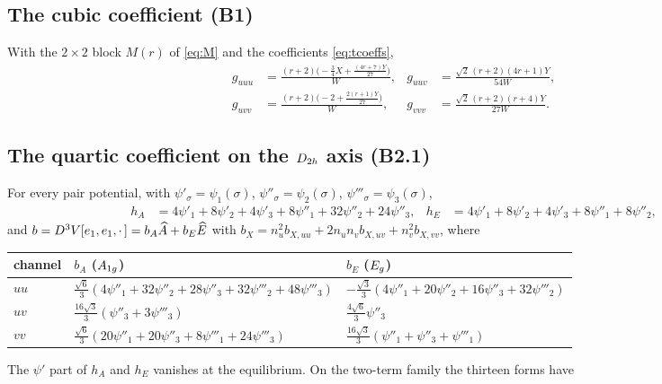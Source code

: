 \subsection{The cubic coefficient (B1)}
With the $2\times2$ block $M(r)$ of \eqref{eq:M} and the coefficients \eqref{eq:tcoeffs},
\begin{align*}
g_{uuu}&=\frac{(r+2)\bigl(-\frac34X+\frac{(4r+7)Y}{27}\bigr)}{W}, &
g_{uuv}&=\frac{\sqrt2\,(r+2)(4r+1)Y}{54W},\\
g_{uvv}&=\frac{(r+2)\bigl(-2+\frac{2(r+1)Y}{27}\bigr)}{W}, &
g_{vvv}&=\frac{\sqrt2\,(r+2)(r+4)Y}{27W}.
\end{align*}

\subsection{The quartic coefficient on the $D_{2h}$ axis (B2.1)}
For every pair potential, with $\psi'_\sigma=\psi_1(\sigma)$, $\psi''_\sigma=\psi_2(\sigma)$, $\psi'''_\sigma=\psi_3(\sigma)$,
\begin{align*}
h_A&=4\psi'_1+8\psi'_2+4\psi'_3+8\psi''_1+32\psi''_2+24\psi''_3, &
h_E&=4\psi'_1+8\psi'_2+4\psi'_3+8\psi''_1+8\psi''_2,
\end{align*}
and $b=D^3V[e_1,e_1,\cdot\,]=b_A\widehat{A}+b_E\widehat{E}$ with $b_X=n_u^2b_{X,uu}+2n_un_vb_{X,uv}+n_v^2b_{X,vv}$, where
\begin{center}\small
\begin{tabular}{lll}
\toprule
channel & $b_{A}$ ($A_{1g}$) & $b_{E}$ ($E_{g}$)\\
\midrule
$uu$ & $\frac{\sqrt6}{3}(4\psi''_1+32\psi''_2+28\psi''_3+32\psi'''_2+48\psi'''_3)$ & $-\frac{\sqrt3}{3}(4\psi''_1+20\psi''_2+16\psi''_3+32\psi'''_2)$\\
$uv$ & $\frac{16\sqrt3}{3}(\psi''_3+3\psi'''_3)$ & $\frac{4\sqrt6}{3}\psi''_3$\\
$vv$ & $\frac{\sqrt6}{3}(20\psi''_1+20\psi''_3+8\psi'''_1+24\psi'''_3)$ & $\frac{16\sqrt3}{3}(\psi''_1+\psi''_3+\psi'''_1)$\\
\bottomrule
\end{tabular}
\end{center}
The $\psi'$ part of $h_A$ and $h_E$ vanishes at the equilibrium. On the two-term family the thirteen forms have
